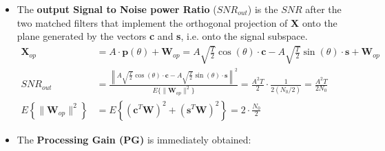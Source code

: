 \begin{itemize}
    \[
\begin{aligned}
\mathbf{X} &= A\cdot\mathbf{p}(\theta) + \mathbf{W}
= A\sqrt{\frac{T}{2}}\cos(\theta)\cdot\mathbf{c} - A\sqrt{\frac{T}{2}}\sin(\theta)\cdot\mathbf{s} + \mathbf{W} \\[2ex]
SNR_{in} &= \frac{\left\|A\sqrt{\frac{T}{2}}\cos(\theta)\cdot\mathbf{c} - A\sqrt{\frac{T}{2}}\sin(\theta)\cdot\mathbf{s}\right\|^2}{E\{\|\mathbf{W}\|^2\}}
= \frac{A^2T}{2} \cdot \frac{1}{N(N_0/2)} = \frac{A^2 T}{2N_0} \cdot \frac{2}{N} \\[2ex]
&= \frac{A^2 T}{2N_0} \cdot \frac{2}{2BT}
= \frac{A^2}{2N_0 B}\end{aligned} \]
\[
\left\| A\sqrt{\frac{T}{2}}\cos(\theta)\cdot\mathbf{c} - A\sqrt{\frac{T}{2}}\sin(\theta)\cdot\mathbf{s}\right\|^2
    = \left(A\sqrt{\frac{T}{2}}\cos(\theta)\right)^2 + \left(-A\sqrt{\frac{T}{2}}\sin(\theta)\right)^2
    = \frac{A^2 T}{2}
\]
    \item The \textbf{output Signal to Noise power Ratio} (\(SNR_{out}\)) is the \(SNR\) after the two matched filters that implement the orthogonal projection of \textbf{X} onto the plane generated by the vectors \textbf{c} and \textbf{s}, i.e. onto the signal subspace.
\[
\begin{aligned}
\mathbf{X}_{op} &= A\cdot\mathbf{p}(\theta) + \mathbf{W}_{op}
= A\sqrt{\frac{T}{2}}\cos(\theta)\cdot\mathbf{c} - A\sqrt{\frac{T}{2}}\sin(\theta)\cdot\mathbf{s} + \mathbf{W}_{op} \\[2ex]
SNR_{out} &= \frac{ \left\| A\sqrt{\frac{T}{2}}\cos(\theta)\cdot\mathbf{c}
              - A\sqrt{\frac{T}{2}}\sin(\theta)\cdot\mathbf{s} \right\|^2 }
             { E\{ \|\mathbf{W}_{op}\|^2 \} }
= \frac{A^2 T}{2} \cdot \frac{1}{2(N_0/2)} = \frac{A^2 T}{2 N_0} \\[3ex]
E\left\{\|\mathbf{W}_{op}\|^2\right\}
 &= E\left\{ \left( \mathbf{c}^T\mathbf{W} \right)^2 + \left( \mathbf{s}^T\mathbf{W} \right)^2 \right\}
= 2 \cdot \frac{N_0}{2}
\end{aligned}
\]
    \item The \textbf{Processing Gain (PG)} is immediately obtained:


\end{itemize}
